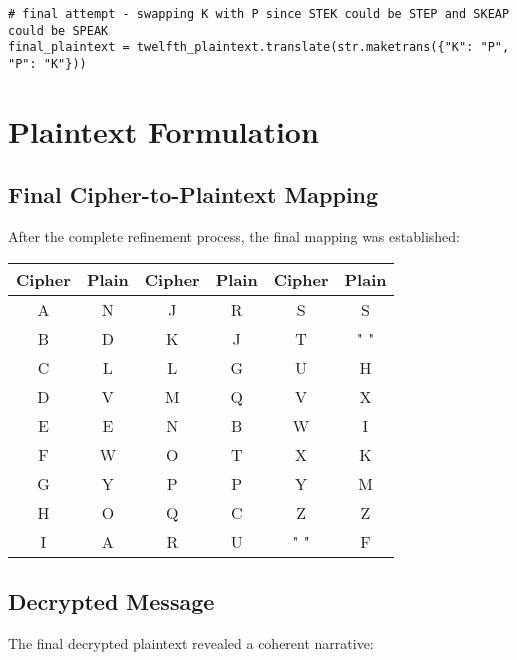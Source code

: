 \documentclass[12pt,a4paper]{article}
\begin{document}
\begin{lstlisting}[caption=Final Adjustment - STEP and SPEAK]
# final attempt - swapping K with P since STEK could be STEP and SKEAP could be SPEAK
final_plaintext = twelfth_plaintext.translate(str.maketrans({"K": "P", "P": "K"}))
\end{lstlisting}

\section{Plaintext Formulation}

\subsection{Final Cipher-to-Plaintext Mapping}

After the complete refinement process, the final mapping was established:

\begin{center}
\begin{longtable}{|c|c||c|c||c|c|}
\hline
\textbf{Cipher} & \textbf{Plain} & \textbf{Cipher} & \textbf{Plain} & \textbf{Cipher} & \textbf{Plain} \\
\hline
A & N & J & R & S & S \\
B & D & K & J & T & " " \\
C & L & L & G & U & H \\
D & V & M & Q & V & X \\
E & E & N & B & W & I \\
F & W & O & T & X & K \\
G & Y & P & P & Y & M \\
H & O & Q & C & Z & Z \\
I & A & R & U & " " & F \\
\hline
\end{longtable}
\end{center}

\subsection{Decrypted Message}

The final decrypted plaintext revealed a coherent narrative:
\end{document}
